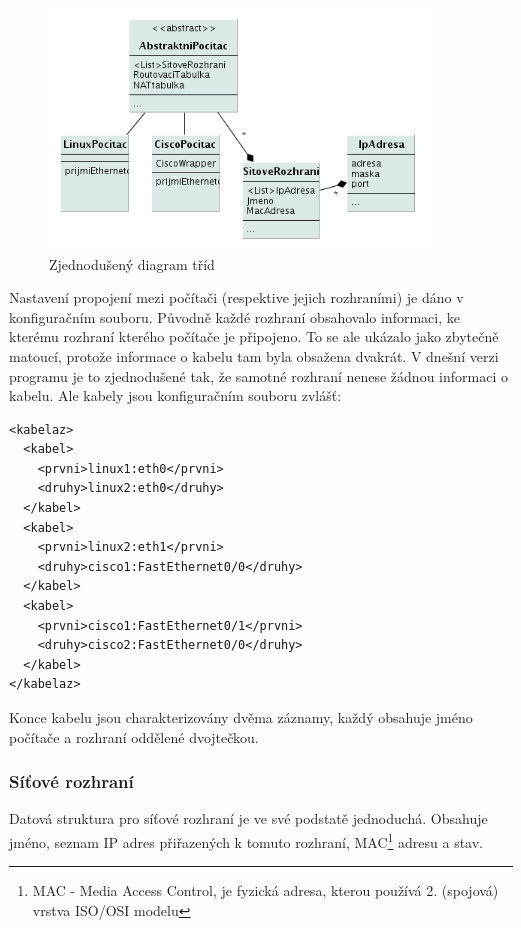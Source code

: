 
\begin{figure}[h]
\begin{center}
\includegraphics[width=10cm]{figures/uml_class}
\caption{Zjednodušený diagram tříd}
\label{fig:class}
\end{center}
\end{figure}

Nastavení propojení mezi počítači (respektive jejich rozhraními) je dáno v konfiguračním souboru. Původně každé rozhraní obsahovalo informaci, ke kterému rozhraní kterého počítače je připojeno. To se ale ukázalo jako zbytečně matoucí, protože informace o kabelu tam byla obsažena dvakrát. V dnešní verzi programu je to zjednodušené tak, že samotné rozhraní nenese žádnou informaci o kabelu. Ale kabely jsou konfiguračním souboru zvlášť:

\begin{verbatim}
<kabelaz>
  <kabel>
    <prvni>linux1:eth0</prvni>
    <druhy>linux2:eth0</druhy>
  </kabel>
  <kabel>
    <prvni>linux2:eth1</prvni>
    <druhy>cisco1:FastEthernet0/0</druhy>
  </kabel>
  <kabel>
    <prvni>cisco1:FastEthernet0/1</prvni>
    <druhy>cisco2:FastEthernet0/0</druhy>
  </kabel>
</kabelaz>
\end{verbatim} 

Konce kabelu jsou charakterizovány dvěma záznamy, každý obsahuje jméno počítače a rozhraní oddělené dvojtečkou.


\subsubsection{Síťové rozhraní}
Datová struktura pro síťové rozhraní je ve své podstatě jednoduchá. Obsahuje jméno, seznam IP adres přiřazených k tomuto rozhraní, MAC\footnote{MAC - Media Access Control, je fyzická adresa, kterou používá 2. (spojová) vrstva ISO/OSI modelu} adresu a stav.

